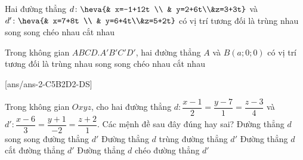 \begin{ex}%
	Hai đường thẳng $d\colon \heva{& x=-1+12t \\ & y=2+6t\\&z=3+3t}$ và $d'\colon\heva{& x=7+8t \\ & y=6+4t\\&z=5+2t}$ có vị trí tương đối là
	\choice
	{\True trùng nhau}
	{song song}
	{chéo nhau}
	{cắt nhau}
\end{ex}
\begin{ex}%
	Trong không gian $ABCD.A'B'C'D'$, hai đường thẳng $A$ và $B(a;0;0)$ có vị trí tương đối là
	\choice
	{trùng nhau}
	{song song}
	{chéo nhau}
	{\True cắt nhau}
\end{ex}
\TNTF
{}[ans/ans-2-C5B2D2-DS]
\begin{ex}%
	Trong không gian $Oxyz$, cho hai đường thẳng $d \colon \dfrac{x-1}{2}=\dfrac{y-7}{1}=\dfrac{z-3}{4}$ và  $d' \colon \dfrac{x-6}{3}=\dfrac{y+1}{-2}=\dfrac{z+2}{1}$. Các mệnh đề sau đây đúng hay sai?
	\choiceTF
	{Đường thẳng $d$ song song đường thẳng $d'$}
	{Đường thẳng $d$ trùng đường thẳng $d'$}
	{\True  Đường thẳng $d$ cắt đường thẳng $d'$}
	{Đường thẳng $d$ chéo đường thẳng $d'$}
\end{ex}
